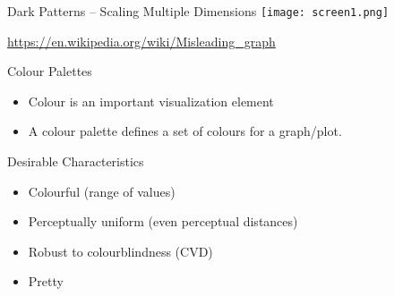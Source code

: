 \documentclass[ignorenonframetext,xcolor=x11names]{beamer}
\begin{document}
\begin{frame}{Dark Patterns -- Scaling Multiple Dimensions}
\centering
\texttt{[image: screen1.png]}

\scriptsize\url{https://en.wikipedia.org/wiki/Misleading_graph}
\end{frame}


\begin{frame}{Colour Palettes}
\begin{itemize}
   \item Colour is an important visualization element
   \item A colour palette defines a set of colours for a graph/plot.
\end{itemize}
\begin{block}{Desirable Characteristics}
\begin{itemize} 
  \item Colourful (range of values)
  \item Perceptually uniform (even perceptual distances)
  \item Robust to colourblindness (CVD)
  \item Pretty
\end{itemize}
\end{block}
\end{frame}
\end{document}
